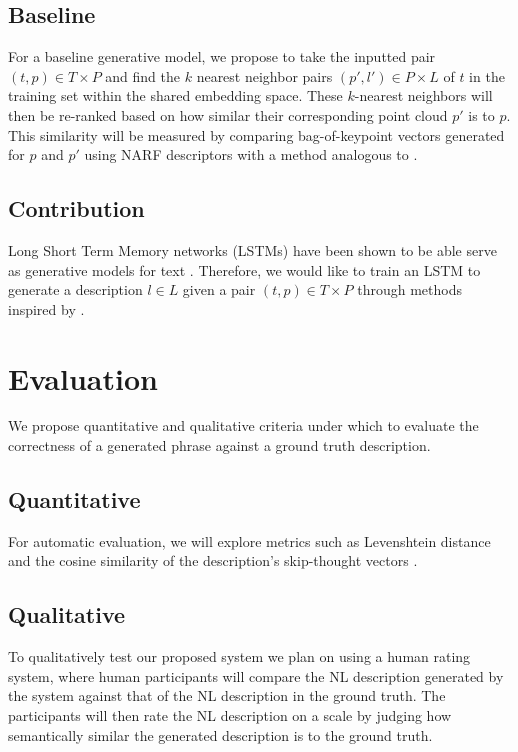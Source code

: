 \documentclass[letterpaper, 12 pt, conference]{ieeeconf}
\begin{document}
\subsection{Baseline}

For a baseline generative model, we propose to take the inputted pair $(t,p)\in T\times P$ and find the $k$ nearest neighbor pairs $(p',l')\in P\times L$ of $t$ in the training set within the shared embedding space. These $k$-nearest neighbors will then be re-ranked based on how similar their corresponding point cloud $p'$ is to $p$. This similarity will be measured by comparing bag-of-keypoint vectors generated for $p$ and  $p'$ using NARF \cite{steder2010narf} descriptors with a method analogous to \cite{csurka2004visual}.    

\subsection{Contribution}

Long Short Term Memory networks (LSTMs) have been shown to be able serve as generative models for text \cite{graves2013generating}. Therefore, we would like to train an LSTM to generate a description $l\in L$ given a pair $(t,p)\in T\times P$ through methods inspired by \cite{Venugopalan_2015_ICCV}.

\section{Evaluation}

We propose quantitative and qualitative criteria under which to evaluate the correctness of a generated phrase against a ground truth description. 

\subsection{Quantitative}
For automatic evaluation, we will explore metrics such as Levenshtein distance and the cosine similarity of the description's skip-thought vectors \cite{skip-thought}.  

\subsection{Qualitative}

To qualitatively test our proposed system we plan on using a human rating system, where human participants will compare the NL description generated by the system against that of the NL description in the ground truth. The participants will then rate the NL description on a scale by judging how semantically similar the generated description is to the ground truth.



\end{document}
